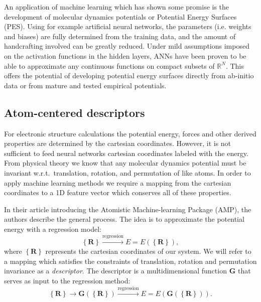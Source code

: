 An application of machine learning which has shown some promise
is the development of molecular dynamics potentials
or Potential Energy Surfaces (PES)\cite{behler2016perspective}.
Using for example
artificial neural networks, the parameters (i.e. weights and biases)
are fully determined from the training data, and the amount
of handcrafting involved can be greatly reduced.
Under mild assumptions imposed on the activation functions in the
hidden layers, ANNs have been proven to be able to approximate
any continuous functions on compact subsets of $\mathbb{R}^N$\cite{
    hornik1989multilayer}.
This offers the potential of developing potential energy surfaces
directly from ab-initio data or from mature and tested
empirical potentials.

\subsection{Atom-centered descriptors}
For electronic structure calculations the potential energy,
forces and other derived properties are determined by
the cartesian coordinates. However, it is not sufficient
to feed neural networks cartesian coordinates labeled with
the energy. From physical theory we know that any molecular dynamics potential
must be invariant w.r.t.\ translation, rotation, and permutation
of like atoms.
In order to apply machine learning methods we require a mapping from
the cartesian coordinates to a 1D feature vector which conserves
all of these properties.
\par
In their article introducing the Atomistic Machine-learning Package (AMP),
the authors \parencite[Khorshidi, Peterson]{khorshidi2016amp}
describe the general process.
The idea is to approximate the potential energy with a regression model:
\begin{equation}
\left\{\bm{R}\right\} \overset{\text{regression}}{\longrightarrow}
    E = E\left( \left\{\bm{R}\right\} \right) ,
\end{equation}
where $\left\{\bm{R}\right\}$ represents the cartesian coordinates of our system.
We will refer to a mapping which satisfies the constraints of 
translation, rotation and permutation invariance as a \textit{descriptor}. 
The descriptor is a multidimensional function $\bm{G}$ that serves as input to
the regression method:
\begin{equation}
    \left\{\bm{R}\right\} \rightarrow \bm{G} \left(\left\{\bm{R}\right\} \right)
\overset{\text{regression}}{\longrightarrow}
E = E \left(\bm{G}\left(\left\{\bm{R}\right\}\right)\right) .
\end{equation}
